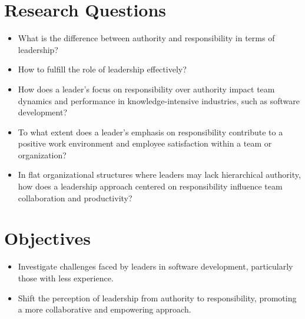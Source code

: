 \documentclass[a4paper,12pt]{report}
\begin{document}
\fontsize{14}{16}\selectfont \section{Research Questions}
\fontsize{14}{20}\selectfont 
\begin{itemize}
\item  What is the difference between authority and responsibility in terms of leadership?
\item  How to fulfill the role of leadership effectively?
\item  How does a leader's focus on responsibility over authority impact team dynamics and performance in  knowledge-intensive industries, such as software development?
\item  To what extent does a leader's emphasis on responsibility contribute to a positive work environment and employee satisfaction within a team or organization?
\item  In flat organizational structures where leaders may lack hierarchical authority, how does a leadership approach centered on responsibility influence team collaboration and productivity?
\end{itemize}

\fontsize{14}{16}\selectfont \section{Objectives}
\fontsize{14}{20}\selectfont
\begin{itemize}
\item  Investigate challenges faced by leaders in software development, particularly those with less experience.
\item  Shift the perception of leadership from authority to responsibility, promoting a more collaborative and empowering approach.
\end{itemize}
\end{document}
